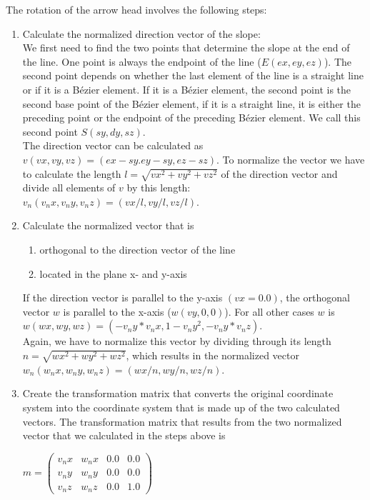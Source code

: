The rotation of the arrow head involves the following steps:

\begin{enumerate}
\item{Calculate the normalized direction vector of the slope:\\
We first need to find the two points that determine the slope at the end of the line. One point is always the endpoint of 
the line ($E(ex,ey,ez)$). The second point depends on whether the last element of the line is a straight line or if it is
a Bézier element. If it is a Bézier element, the second point is the second base point of the Bézier element, if it is a 
straight line, it is either the preceding point or the endpoint of the preceding Bézier element. We call this second
point $S(sy,dy,sz)$.\\ The direction vector can be calculated as $v(vx,vy,vz)=(ex-sy.ey-sy,ez-sz)$. To normalize the vector
we have to calculate the length $l=\sqrt{vx^2+vy^2+vz^2}$ of the direction vector and divide all elements of $v$ by this
length: $v_n(v_{n}x,v_{n}y,v_{n}z)=(vx/l,vy/l,vz/l)$}.

\item{Calculate the normalized vector that is
\begin{enumerate}
\item{orthogonal to the direction vector of the line}
\item{located in the plane x- and y-axis}
\end{enumerate}
If the direction vector is parallel to the y-axis $(vx=0.0)$, the orthogonal vector $w$ is parallel to the x-axis ($w(vy,0,0)$).
For all other cases $w$ is $w(wx,wy,wz)=(-v_{n}y*v_{n}x,1-v_{n}y^2,-v_{n}y*v_{n}z)$.\\ Again, we have to normalize this
vector by dividing through its length $n=\sqrt{wx^2+wy^2+wz^2}$, which results in the normalized vector $w_n(w_{n}x,w_{n}y,w_{n}z)=(wx/n,wy/n,wz/n)$.
}
\item{Create the transformation matrix that converts the original coordinate system into the coordinate system
that is made up of the two calculated vectors. The transformation matrix that results from the two normalized vector that we calculated in the steps above
is 

\begin{center}
$m=\left(\begin{array}{cccc} v_{n}x & w_{n}x & 0.0 & 0.0\\ v_{n}y & w_{n}y & 0.0 & 0.0\\ v_{n}z & w_{n}z & 0.0 & 1.0 \end{array}\right)$
\end{center}
}


\end{enumerate}


